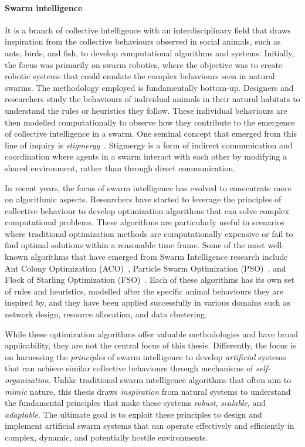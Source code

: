 \paragraph*{Swarm intelligence} It is a branch of collective intelligence with an interdisciplinary field that draws inspiration from the collective behaviours observed in social animals, 
 such as ants, birds, and fish, to develop computational algorithms and systems. 
 Initially, the focus was primarily on swarm robotics, 
 where the objective was to create robotic systems that could emulate the complex behaviours seen in natural swarms. 
 The methodology employed is fundamentally bottom-up. 
 Designers and researchers study the behaviours of individual animals in their natural habitats to understand the rules or heuristics they follow. 
 These individual behaviours are then modelled computationally to observe how they contribute to the emergence of collective intelligence in a swarm. 
 One seminal concept that emerged from this line of inquiry is \textit{stigmergy}~\cite{DBLP:journals/fgcs/DorigoBT00}. 
 Stigmergy is a form of indirect communication and coordination where agents in a swarm interact with each other by modifying a shared environment, rather than through direct communication.

In recent years, the focus of swarm intelligence has evolved to concentrate more on algorithmic aspects. 
 Researchers have started to leverage the principles of collective behaviour to develop optimization algorithms that can solve complex computational problems. 
 These algorithms are particularly useful in scenarios where traditional optimization methods are computationally expensive or fail to find optimal solutions within a reasonable time frame. 
 Some of the most well-known algorithms that have emerged from Swarm Intelligence research include Ant Colony Optimization (ACO)~\cite{DBLP:journals/tsmc/DorigoMC96}, Particle Swarm Optimization (PSO)~\cite{DBLP:conf/icnn/KennedyE95}, and Flock of Starling Optimization (FSO)~\cite{DBLP:series/sci/FulgineiS11}. 
Each of these algorithms has its own set of rules and heuristics, modelled after the specific animal behaviours they are inspired by, and they have been applied successfully in various domains such as network design, resource allocation, and data clustering.

While these optimization algorithms offer valuable methodologies and have broad applicability, they are not the central focus of this thesis. 
 Differently, the focus is on harnessing the \emph{principles} of swarm intelligence to develop \emph{artificial} systems that can achieve similar collective behaviours through mechanisms of \emph{self-organization}. 
 Unlike traditional swarm intelligence algorithms that often aim to \textit{mimic} nature, this thesis draws \textit{inspiration} from natural systems to understand the fundamental principles that make these systems \emph{robust}, \emph{scalable}, and \emph{adaptable}. 
 The ultimate goal is to exploit these principles to design and implement artificial swarm systems that can operate effectively and efficiently in complex, dynamic, and potentially hostile environments. 
 
